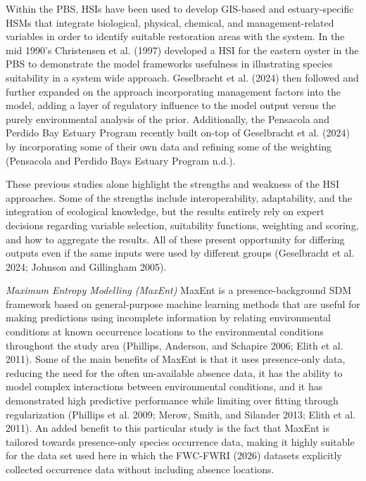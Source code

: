 \documentclass[
  letterpaper,
  DIV=11,
  numbers=noendperiod]{scrartcl}
\begin{document}
Within the PBS, HSIs have been used to develop GIS-based and
estuary-specific HSMs that integrate biological, physical, chemical, and
management-related variables in order to identify suitable restoration
areas with the system. In the mid 1990's Christensen et al. (1997)
developed a HSI for the eastern oyster in the PBS to demonstrate the
model frameworks usefulness in illustrating species suitability in a
system wide approach. Geselbracht et al. (2024) then followed and
further expanded on the approach incorporating management factors into
the model, adding a layer of regulatory influence to the model output
versus the purely environmental analysis of the prior. Additionally, the
Pensacola and Perdido Bay Estuary Program recently built on-top of
Geselbracht et al. (2024) by incorporating some of their own data and
refining some of the weighting (Pensacola and Perdido Bays Estuary
Program n.d.).

These previous studies alone highlight the strengths and weakness of the
HSI approaches. Some of the strengths include interoperability,
adaptability, and the integration of ecological knowledge, but the
results entirely rely on expert decisions regarding variable selection,
suitability functions, weighting and scoring, and how to aggregate the
results. All of these present opportunity for differing outputs even if
the same inputs were used by different groups (Geselbracht et al. 2024;
Johnson and Gillingham 2005).

\emph{Maximum Entropy Modelling (MaxEnt)} MaxEnt is a
presence-background SDM framework based on general-purpose machine
learning methods that are useful for making predictions using incomplete
information by relating environmental conditions at known occurrence
locations to the environmental conditions throughout the study area
(Phillips, Anderson, and Schapire 2006; Elith et al. 2011). Some of the
main benefits of MaxEnt is that it uses presence-only data, reducing the
need for the often un-available absence data, it has the ability to
model complex interactions between environmental conditions, and it has
demonstrated high predictive performance while limiting over fitting
through regularization (Phillips et al. 2009; Merow, Smith, and Silander
2013; Elith et al. 2011). An added benefit to this particular study is
the fact that MaxEnt is tailored towards presence-only species
occurrence data, making it highly suitable for the data set used here in
which the FWC-FWRI (2026) datasets explicitly collected occurrence data
without including absence locations.
\end{document}

